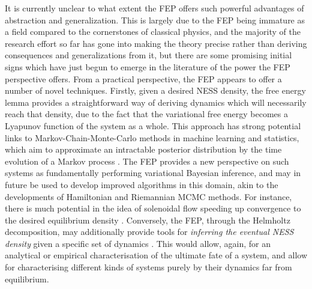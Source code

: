 It is currently unclear to what extent the FEP offers such powerful advantages of abstraction and generalization. This is largely due to the FEP being immature as a field compared to the cornerstones of classical physics, and the majority of the research effort so far has gone into making the theory precise rather than deriving consequences and generalizations from it, but there are some promising initial signs which have just begun to emerge in the literature of the power the FEP perspective offers. From a practical perspective, the FEP appears to offer a number of novel techniques. Firstly, given a desired NESS density, the free energy lemma provides a straightforward way of deriving dynamics which will necessarily reach that density, due to the fact that the variational free energy becomes a Lyapunov function of the system as a whole. This approach has strong potential links to Markov-Chain-Monte-Carlo methods in machine learning and statistics, which aim to approximate an intractable posterior distribution by the time evolution of a Markov process \citep{metropolis1953equation,neal2011MCMC,betancourt2017conceptual,chen2014stochastic,brooks2011handbook}. The FEP provides a new perspective on such systems as fundamentally performing variational Bayesian inference, and may in future be used to develop improved algorithms in this domain, akin to the developments of Hamiltonian \citep{betancourt2013generalizing} and Riemannian MCMC \citep{girolami2011riemann} methods. For instance, there is much potential in the idea of solenoidal flow speeding up convergence to the desired equilibrium density \citep{ma2015complete}. Conversely, the FEP, through the Helmholtz decomposition, may additionally provide tools for \emph{inferring the eventual NESS density} given a specific set of dynamics \citep{ma2015complete,friston2019particularphysics}. This would allow, again, for an analytical or empirical characterisation of the ultimate fate of a system, and allow for characterising different kinds of systems purely by their dynamics far from equilibrium. 

